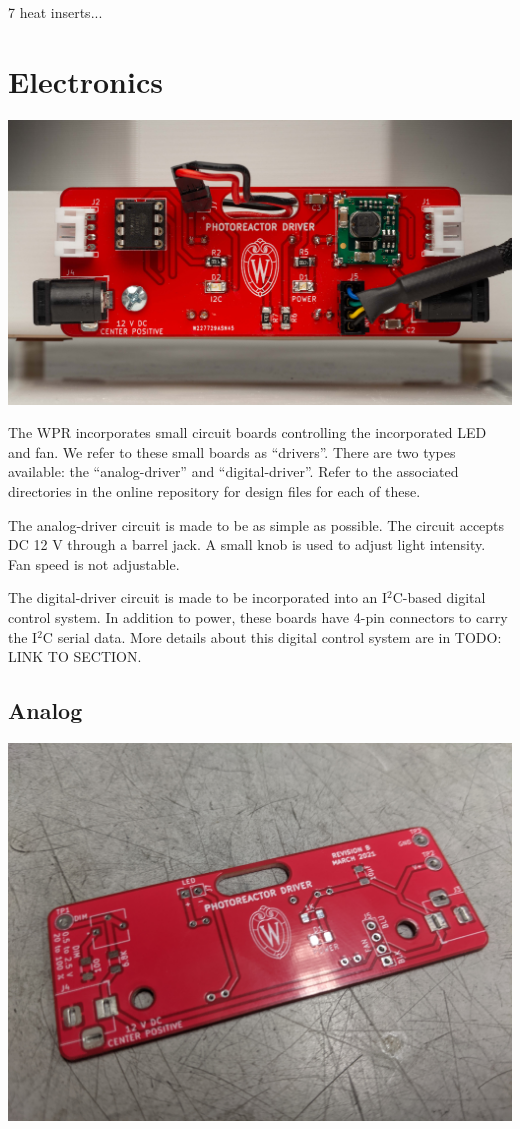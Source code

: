 \documentclass[11pt]{article}
\let\stdsection\section
\renewcommand\section{\clearpage\stdsection}
\begin{document}
7 heat inserts...

\section{Electronics}

\includegraphics[width=\textwidth]{"./electronics-coverart.jpg"}

The WPR incorporates small circuit boards controlling the incorporated LED and fan.
We refer to these small boards as ``drivers''.
There are two types available: the ``analog-driver'' and ``digital-driver''.
Refer to the associated directories in the online repository for design files for each of these.

The analog-driver circuit is made to be as simple as possible.
The circuit accepts DC 12 V through a barrel jack.
A small knob is used to adjust light intensity.
Fan speed is not adjustable.

The digital-driver circuit is made to be incorporated into an I$^2$C-based digital control system.
In addition to power, these boards have 4-pin connectors to carry the I$^2$C serial data.
More details about this digital control system are in TODO: LINK TO SECTION.

\clearpage
\subsection{Analog}

\begin{center}
  \includegraphics[width=\textwidth/2]{"./bare-pcb.jpg"}
\end{center}
\end{document}
